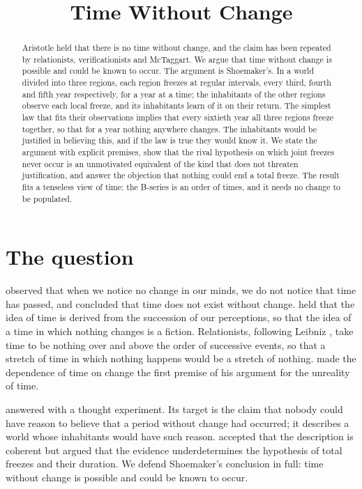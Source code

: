 \documentclass{situationist-preprint}
\title{Time Without Change}
\begin{document}
\maketitle

\begin{abstract}
Aristotle held that there is no time without change, and the claim has been repeated by relationists, verificationists and McTaggart. We argue that time without change is possible and could be known to occur. The argument is Shoemaker's. In a world divided into three regions, each region freezes at regular intervals, every third, fourth and fifth year respectively, for a year at a time; the inhabitants of the other regions observe each local freeze, and its inhabitants learn of it on their return. The simplest law that fits their observations implies that every sixtieth year all three regions freeze together, so that for a year nothing anywhere changes. The inhabitants would be justified in believing this, and if the law is true they would know it. We state the argument with explicit premises, show that the rival hypothesis on which joint freezes never occur is an unmotivated equivalent of the kind that does not threaten justification, and answer the objection that nothing could end a total freeze. The result fits a tenseless view of time: the B-series is an order of times, and it needs no change to be populated.
\end{abstract}

\section{The question}

\citet[IV.11, 218b21--219a10]{AristotlePhys} observed that when we notice no change in our minds, we do not notice that time has passed, and concluded that time does not exist without change. \citet[1.2.3]{HumeTreatise} held that the idea of time is derived from the succession of our perceptions, so that the idea of a time in which nothing changes is a fiction. Relationists, following Leibniz \citep{Alexander1956}, take time to be nothing over and above the order of successive events, so that a stretch of time in which nothing happens would be a stretch of nothing. \citet{McTaggart1908} made the dependence of time on change the first premise of his argument for the unreality of time.

\citet{Shoemaker1969} answered with a thought experiment. Its target is the claim that nobody could have reason to believe that a period without change had occurred; it describes a world whose inhabitants would have such reason. \citet{NewtonSmith1980} accepted that the description is coherent but argued that the evidence underdetermines the hypothesis of total freezes and their duration. We defend Shoemaker's conclusion in full: time without change is possible and could be known to occur.
\end{document}
